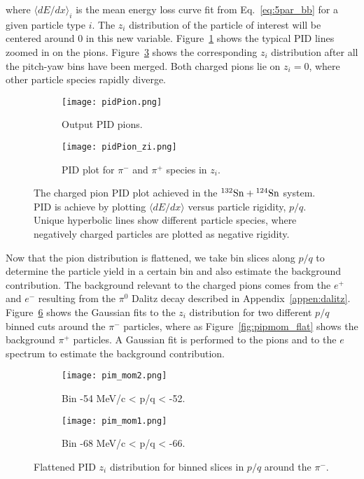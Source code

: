 where $\langle dE/dx\rangle_i$ is the mean energy loss curve fit from Eq.~\ref{eq:5par_bb} for a given particle type $i$. The $z_i$ distribution of the particle of interest will be centered around 0 in this new variable. Figure~\ref{fig:pidpion_raw} shows the typical PID lines zoomed in on the pions. Figure~\ref{fig:pidpion} shows the corresponding $z_i$ distribution after all the pitch-yaw bins have been merged. Both charged pions lie on $z_i=0$, where other particle species rapidly diverge. 

\begin{figure}[!htb]
    \centering
    \begin{subfigure}[t]{0.49\textwidth}
        \centering
        \texttt{[image: pidPion.png]}
        \caption{Output PID pions.} \label{fig:pidpion_raw}
    \end{subfigure}
    \hfill
    \begin{subfigure}[t]{.49\textwidth}
        \centering
        \texttt{[image: pidPion\_zi.png]} 
        \caption{PID plot for $\pi^-$ and $\pi^+$ species in $z_i$. } \label{fig:pipion_zi}
    \end{subfigure}
  
    \caption{The charged pion PID plot achieved in the ${}^{132}\mathrm{Sn} + {}^{124}\mathrm{Sn}$ system. PID is achieve by plotting $\langle dE/dx\rangle$ versus particle rigidity, $p/q$. Unique hyperbolic lines show different particle species, where negatively charged particles are plotted as negative rigidity.  }
\label{fig:pidpion}
\end{figure}

Now that the pion distribution is flattened, we take bin slices along $p/q$ to determine the particle yield in a certain bin and also estimate the background contribution. The background relevant to  the charged pions comes from the $e^+$ and $e^-$ resulting from the $\pi^0$ Dalitz decay described in Appendix~\ref{appen:dalitz}. Figure~\ref{fig:pimmom_flat} shows the Gaussian fits to the $z_i$ distribution for two different $p/q$ binned cuts around the $\pi^-$ particles, where as Figure~\ref{fig:pipmom_flat} shows the background $\pi^+$ particles. A Gaussian fit is performed to the pions and to the $e$ spectrum to estimate the background contribution. 


\begin{figure}[!htb]
    \centering
    \begin{subfigure}[t]{0.49\textwidth}
        \centering
        \texttt{[image: pim\_mom2.png]}
        \caption{Bin -54 MeV/c < p/q < -52. } \label{fig:pimmom2}
    \end{subfigure}
    \hfill
    \begin{subfigure}[t]{.49\textwidth}
        \centering
        \texttt{[image: pim\_mom1.png]} 
        \caption{Bin -68 MeV/c < p/q < -66.} \label{fig:pimmom1}
    \end{subfigure}
  
    \caption{Flattened PID $z_i$ distribution for binned slices in $p/q$ around the $\pi^-$.}
\label{fig:pimmom_flat}
\end{figure}



